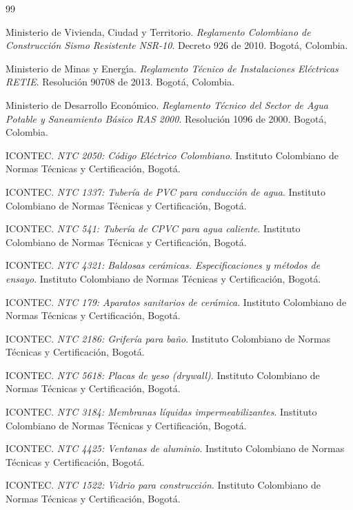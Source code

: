 ﻿\documentclass[12pt]{article}
\begin{document}
\begin{thebibliography}{99}

 Ministerio de Vivienda, Ciudad y Territorio. \textit{Reglamento Colombiano de Construcción Sismo Resistente NSR-10}. Decreto 926 de 2010. Bogot\'a, Colombia.

 Ministerio de Minas y Energ\'{\i}a. \textit{Reglamento Técnico de Instalaciones Eléctricas RETIE}. Resoluci\'on 90708 de 2013. Bogot\'a, Colombia.

 Ministerio de Desarrollo Econ\'omico. \textit{Reglamento Técnico del Sector de Agua Potable y Saneamiento Básico RAS 2000}. Resoluci\'on 1096 de 2000. Bogot\'a, Colombia.

 ICONTEC. \textit{NTC 2050: Código Eléctrico Colombiano}. Instituto Colombiano de Normas Técnicas y Certificación, Bogot\'a.

 ICONTEC. \textit{NTC 1337: Tubería de PVC para conducción de agua}. Instituto Colombiano de Normas Técnicas y Certificación, Bogot\'a.

 ICONTEC. \textit{NTC 541: Tubería de CPVC para agua caliente}. Instituto Colombiano de Normas Técnicas y Certificación, Bogot\'a.

 ICONTEC. \textit{NTC 4321: Baldosas cerámicas. Especificaciones y métodos de ensayo}. Instituto Colombiano de Normas Técnicas y Certificación, Bogot\'a.

 ICONTEC. \textit{NTC 179: Aparatos sanitarios de cerámica}. Instituto Colombiano de Normas Técnicas y Certificación, Bogot\'a.

 ICONTEC. \textit{NTC 2186: Grifería para baño}. Instituto Colombiano de Normas Técnicas y Certificación, Bogot\'a.

 ICONTEC. \textit{NTC 5618: Placas de yeso (drywall)}. Instituto Colombiano de Normas Técnicas y Certificación, Bogot\'a.

 ICONTEC. \textit{NTC 3184: Membranas líquidas impermeabilizantes}. Instituto Colombiano de Normas Técnicas y Certificación, Bogot\'a.

 ICONTEC. \textit{NTC 4425: Ventanas de aluminio}. Instituto Colombiano de Normas Técnicas y Certificación, Bogot\'a.

 ICONTEC. \textit{NTC 1522: Vidrio para construcción}. Instituto Colombiano de Normas Técnicas y Certificación, Bogot\'a.


\end{thebibliography}
\end{document}
